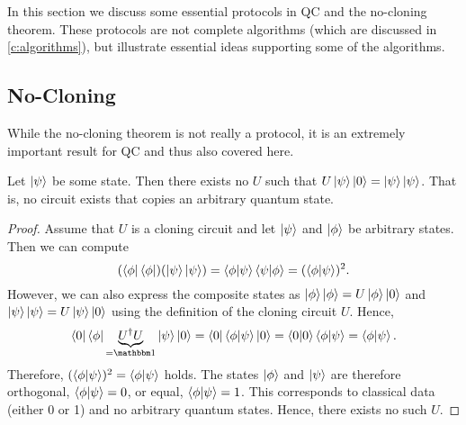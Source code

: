 		In this section we discuss some essential protocols in \ac{QC} and the no-cloning theorem. These protocols are not complete algorithms (which are discussed in \autoref{c:algorithms}), but illustrate essential ideas supporting some of the algorithms.

		\subsection{No-Cloning}
			While the no-cloning theorem is not really a protocol, it is an extremely important result for \ac{QC} and thus also covered here.

			\begin{theorem}[No-Cloning]
				Let \(\ket{\psi}\) be some state. Then there exists no \(U\) such that \( U \ket{\psi} \ket{0} = \ket{\psi}\ket{\psi} \). That is, no circuit exists that copies an arbitrary quantum state.
			\end{theorem}
			\begin{proof}
				Assume that \(U\) is a cloning circuit and let \(\ket{\psi}\) and \(\ket{\phi}\) be arbitrary states. Then we can compute
				\begin{equation}
					(\bra{\phi}\bra{\phi}) (\ket{\psi}\ket{\psi})
					= \ip{\phi}{\psi} \ip{\psi}{\phi}
					= (\ip{\phi}{\psi})^2.
				\end{equation}
				However, we can also express the composite states as \( \ket{\phi}\ket{\phi} = U \ket{\phi}\ket{0} \) and \( \ket{\psi}\ket{\psi} = U \ket{\psi}\ket{0} \) using the definition of the cloning circuit \(U\). Hence,
				\begin{equation}
					\bra{0}\bra{\phi} \underbrace{U^\dagger U}_{= \ID} \ket{\psi}\ket{0}
					= \bra{0}\bra{\phi} \ket{\psi}\ket{0}
					= \ip{0}{0} \ip{\phi}{\psi}
					= \ip{\phi}{\psi}.
				\end{equation}
				Therefore, \( (\ip{\phi}{\psi})^2 = \ip{\phi}{\psi} \) holds. The states \(\ket{\phi}\) and \(\ket{\psi}\) are therefore orthogonal, \( \ip{\phi}{\psi} = 0 \), or equal, \( \ip{\phi}{\psi} = 1 \). This corresponds to classical data (either \num{0} or \num{1}) and no arbitrary quantum states. Hence, there exists no such \(U\).
			\end{proof}


